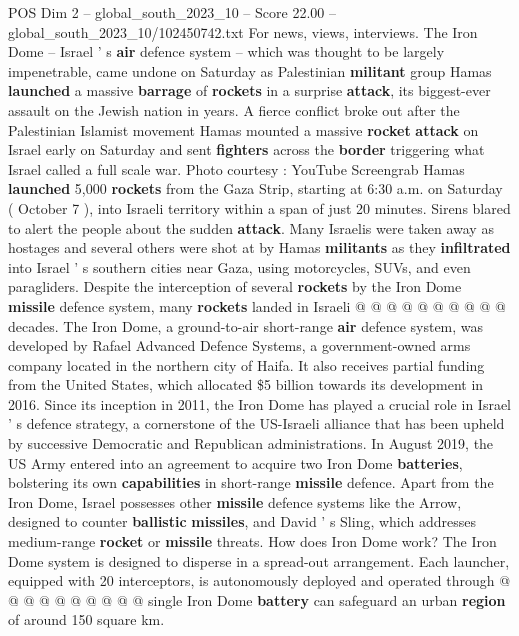 \begin{textsample}{POS Dim 2 – global\_south\_2023\_10 – Score 22.00 – global\_south\_2023\_10/102450742.txt}  \label{ex:f2_pos_060}
For news, views, interviews.
The Iron Dome -- Israel ' s \textbf{air} defence system -- which was thought to be largely impenetrable, came undone on Saturday as Palestinian \textbf{militant} group Hamas \textbf{launched} a massive \textbf{barrage} of \textbf{rockets} in a surprise \textbf{attack}, its biggest-ever assault on the Jewish nation in years.
A fierce conflict broke out after the Palestinian Islamist movement Hamas mounted a massive \textbf{rocket} \textbf{attack} on Israel early on Saturday and sent \textbf{fighters} across the \textbf{border} triggering what Israel called a full scale war.
Photo courtesy : YouTube Screengrab Hamas \textbf{launched} 5,000 \textbf{rockets} from the Gaza Strip, starting at 6:30 a.m. on Saturday ( October 7 ), into Israeli territory within a span of just 20 minutes.
Sirens blared to alert the people about the sudden \textbf{attack}.
Many Israelis were taken away as hostages and several others were shot at by Hamas \textbf{militants} as they \textbf{infiltrated} into Israel ' s southern cities near Gaza, using motorcycles, SUVs, and even paragliders.
Despite the interception of several \textbf{rockets} by the Iron Dome \textbf{missile} defence system, many \textbf{rockets} landed in Israeli @ @ @ @ @ @ @ @ @ @ decades.
The Iron Dome, a ground-to-air short-range \textbf{air} defence system, was developed by Rafael Advanced Defence Systems, a government-owned arms company located in the northern city of Haifa.
It also receives partial funding from the United States, which allocated \$5 billion towards its development in 2016.
Since its inception in 2011, the Iron Dome has played a crucial role in Israel ' s defence strategy, a cornerstone of the US-Israeli alliance that has been upheld by successive Democratic and Republican administrations.
In August 2019, the US Army entered into an agreement to acquire two Iron Dome \textbf{batteries}, bolstering its own \textbf{capabilities} in short-range \textbf{missile} defence.
Apart from the Iron Dome, Israel possesses other \textbf{missile} defence systems like the Arrow, designed to counter \textbf{ballistic} \textbf{missiles}, and David ' s Sling, which addresses medium-range \textbf{rocket} or \textbf{missile} threats.
How does Iron Dome work?
The Iron Dome system is designed to disperse in a spread-out arrangement.
Each launcher, equipped with 20 interceptors, is autonomously deployed and operated through @ @ @ @ @ @ @ @ @ @ single Iron Dome \textbf{battery} can safeguard an urban \textbf{region} of around 150 square km.

\end{textsample}
